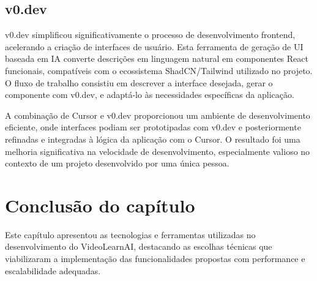 \documentclass[tcc,capa]{texufpel}
\begin{document}
\subsection{v0.dev}
v0.dev simplificou significativamente o processo de desenvolvimento frontend, acelerando a criação de interfaces de usuário. Esta ferramenta de geração de UI baseada em IA converte descrições em linguagem natural em componentes React funcionais, compatíveis com o ecossistema ShadCN/Tailwind utilizado no projeto. O fluxo de trabalho consistiu em descrever a interface desejada, gerar o componente com v0.dev, e adaptá-lo às necessidades específicas da aplicação.

A combinação de Cursor e v0.dev proporcionou um ambiente de desenvolvimento eficiente, onde interfaces podiam ser prototipadas com v0.dev e posteriormente refinadas e integradas à lógica da aplicação com o Cursor. O resultado foi uma melhoria significativa na velocidade de desenvolvimento, especialmente valioso no contexto de um projeto desenvolvido por uma única pessoa.



\section{Conclusão do capítulo}

Este capítulo apresentou as tecnologias e ferramentas utilizadas no desenvolvimento do VideoLearnAI, destacando as escolhas técnicas que viabilizaram a implementação das funcionalidades propostas com performance e escalabilidade adequadas.
\end{document}
